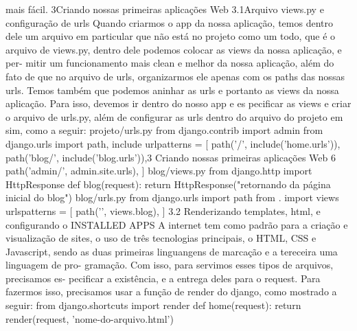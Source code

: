 \documentclass{paper}
\begin{document}
mais fácil.
3Criando nossas primeiras aplicações Web
3.1Arquivo views.py e configuração de urls
Quando criarmos o app da nossa aplicação, temos dentro dele um arquivo
em particular que não está no projeto como um todo, que é o arquivo de
views.py, dentro dele podemos colocar as views da nossa aplicação, e per-
mitir um funcionamento mais clean e melhor da nossa aplicação, além do
fato de que no arquivo de urls, organizarmos ele apenas com os paths das
nossas urls.
Temos também que podemos aninhar as urls e portanto as views da nossa
aplicação. Para isso, devemos ir dentro do nosso app e es pecificar as views
e criar o arquivo de urls.py, além de configurar as urls dentro do arquivo
do projeto em sim, como a seguir:
projeto/urls.py
from django.contrib import admin
from django.urls import path, include
urlpatterns = [
path(’/’, include(’home.urls’)),
path(’blog/’, include(’blog.urls’)),3 Criando nossas primeiras aplicações Web
6
path(’admin/’, admin.site.urls),
]
blog/views.py
from django.http import HttpResponse
def blog(request):
return HttpResponse("retornando da página inicial do blog")
blog/urls.py
from django.urls import path
from . import views
urlspatterns = [
path(’’, views.blog),
]
3.2
Renderizando templates, html, e configurando o
INSTALLED APPS
A internet tem como padrão para a criação e visualização de sites, o uso
de três tecnologias principais, o HTML, CSS e Javascript, sendo as duas
primeiras linguangens de marcação e a tereceira uma linguagem de pro-
gramação. Com isso, para servimos esses tipos de arquivos, precisamos es-
pecificar a existência, e a entrega deles para o request. Para fazermos isso,
precisamos usar a função de render do django, como mostrado a seguir:
from django.shortcuts import render
def home(request):
return render(request,
’nome-do-arquivo.html’) %
\label{sec:}
\end{document}
